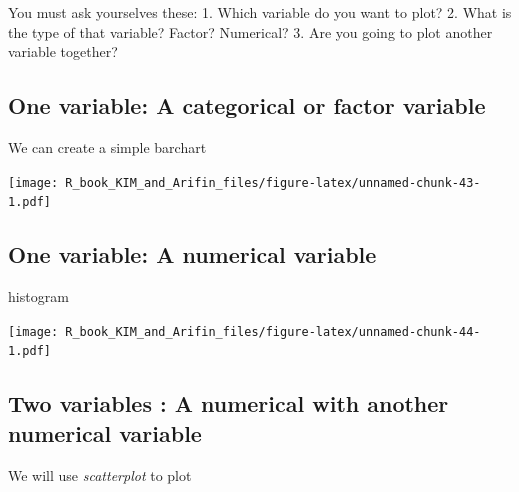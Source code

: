 \documentclass[]{book}
\newenvironment{Shaded}{\begin{snugshade}}{\end{snugshade}}
\newcommand{\KeywordTok}[1]{\textcolor[rgb]{0.13,0.29,0.53}{\textbf{#1}}}
\newcommand{\DataTypeTok}[1]{\textcolor[rgb]{0.13,0.29,0.53}{#1}}
\newcommand{\StringTok}[1]{\textcolor[rgb]{0.31,0.60,0.02}{#1}}
\newcommand{\OperatorTok}[1]{\textcolor[rgb]{0.81,0.36,0.00}{\textbf{#1}}}
\newcommand{\NormalTok}[1]{#1}
\theoremstyle{definition}
\theoremstyle{definition}
\theoremstyle{remark}
\begin{document}
You must ask yourselves these: 1. Which variable do you want to plot? 2.
What is the type of that variable? Factor? Numerical? 3. Are you going
to plot another variable together?

\subsection{One variable: A categorical or factor
variable}\label{one-variable-a-categorical-or-factor-variable}

We can create a simple barchart

\begin{Shaded}
\end{Shaded}

\texttt{[image: R\_book\_KIM\_and\_Arifin\_files/figure-latex/unnamed-chunk-43-1.pdf]}

\subsection{One variable: A numerical
variable}\label{one-variable-a-numerical-variable}

histogram

\begin{Shaded}
\end{Shaded}

\texttt{[image: R\_book\_KIM\_and\_Arifin\_files/figure-latex/unnamed-chunk-44-1.pdf]}

\subsection{Two variables : A numerical with another numerical
variable}\label{two-variables-a-numerical-with-another-numerical-variable}

We will use \emph{scatterplot} to plot
\end{document}

